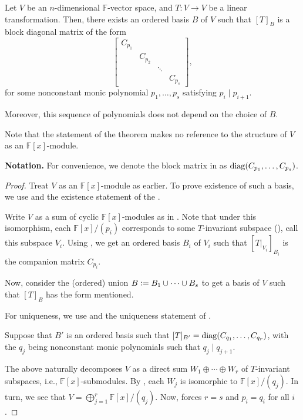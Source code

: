 \documentclass[12pt]{article}
\begin{document}
\begin{thm}
	Let $V$ be an $n$-dimensional $\mathbb{F}$-vector space, and $T : V \to V$ be a linear transformation. Then, there exists an ordered basis $B$ of $V$ such that $[T]_{B}$ is a block diagonal matrix of the form
	\begin{equation} \label{eq:03}
		\begin{bmatrix}
			C_{p_{1}} & & & \\
			& C_{p_{2}} & & \\
			& & \ddots & \\
			& & & C_{p_{s}}
		\end{bmatrix},
	\end{equation}
	for some nonconstant monic polynomial $p_{1}, \ldots, p_{s}$ satisfying $p_{i} \mid p_{i + 1}$. 

	Moreover, this sequence of polynomials does not depend on the choice of $B$.
\end{thm}
Note that the statement of the theorem makes no reference to the structure of $V$ as an $\mathbb{F}[x]$-module.

\textbf{Notation.} For convenience, we denote the block matrix in  as $\operatorname{diag}(C_{p_{1}}, \ldots, C_{p_{s}})$.

\begin{proof} 
	Treat $V$ as an $\mathbb{F}[x]$-module as earlier. To prove existence of such a basis, we use  and the existence statement of the .

	Write $V$ as a sum of cyclic $\mathbb{F}[x]$-modules as in . Note that under this isomorphism, each $\mathbb{F}[x]/(p_{i})$ corresponds to some $T$-invariant subspace (), call this subspace $V_{i}$. Using , we get an ordered basis $B_{i}$ of $V_{i}$ such that $[T|_{V_{i}}]_{B_{i}}$ is the companion matrix $C_{p_{i}}$.

	Now, consider the (ordered) union $B \vcentcolon= B_{1} \cup \cdots \cup B_{s}$ to get a basis of $V$ such that $[T]_{B}$ has the form mentioned.

	For uniqueness, we use  and the uniqueness statement of . 

	Suppose that $B'$ is an ordered basis such that $[T]_{B'} = \operatorname{diag}(C_{q_{1}}, \ldots, C_{q_{r}})$, with the $q_{j}$ being nonconstant monic polynomials such that $q_{j} \mid q_{j + 1}$. 

	The above naturally decomposes $V$ as a direct sum $W_{1} \oplus \cdots \oplus W_{r}$ of $T$-invariant subspaces, i.e., $\mathbb{F}[x]$-submodules. By , each $W_{j}$ is isomorphic to $\mathbb{F}[x]/(q_{j})$. In turn, we see that $V = \bigoplus_{j = 1}^{r} \mathbb{F}[x]/(q_{j})$. Now,  forces $r = s$ and $p_{i} = q_{i}$ for all $i$.
\end{proof}
\end{document}
